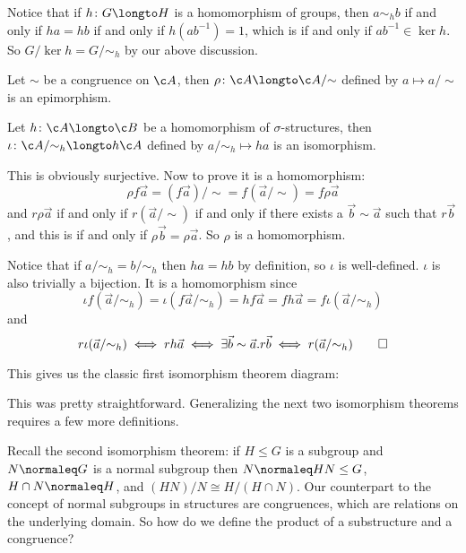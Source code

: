 Notice that if $h\colon G\longto H$ is a homomorphism of groups, then $a\sim_hb$ if and only if $ha=hb$ if and only if $h(ab^{-1})=1$, which is if and only if $ab^{-1}\in\ker h$.
So $G/\ker h=G/{\sim_h}$ by our above discussion.

\bthrm[title=The First Isomorphism Theorem]

    \benum
        \item Let $\sim$ be a congruence on $\c A$, then $\rho\colon\c A\longto\c A/{\sim}$ defined by $a\mapsto a/{\sim}$ is an epimorphism.
        \item Let $h\colon\c A\longto\c B$ be a homomorphism of $\sigma$-structures, then $\iota\colon\c A/{\sim_h}\longto h\c A$ defined by $a/{\sim_h}\mapsto ha$ is an isomorphism.
    \eenum

\ethrm

\Proof
\benum
    \item This is obviously surjective.
    Now to prove it is a homomorphism:
    $$ \rho f\vec a = (f\vec a)/{\sim} = f(\vec a/{\sim}) = f\rho\vec a $$
    and $r\rho\vec a$ if and only if $r(\vec a/{\sim})$ if and only if there exists a $\vec b\sim\vec a$ such that $r\vec b$, and this is if and only if $\rho\vec b=\rho\vec a$.
    So $\rho$ is a homomorphism.

    \item Notice that if $a/{\sim_h}=b/{\sim_h}$ then $ha=hb$ by definition, so $\iota$ is well-defined.
    $\iota$ is also trivially a bijection.
    It is a homomorphism since
    $$ \iota f(\vec a/{\sim_h}) = \iota(f\vec a/{\sim_h}) = hf\vec a = fh\vec a = f\iota(\vec a/{\sim_h}) $$
    and
    $$ r\iota(\vec a/{\sim_h}) \iff rh\vec a \iff \exists\vec b\sim\vec a.r\vec b \iff r(\vec a/{\sim_h}) \qed $$
\eenum

This gives us the classic first isomorphism theorem diagram:

\bigskip
\centerline{\def\diagcolbuf{1cm}\def\diagrowbuf{1cm}}

This was pretty straightforward.
Generalizing the next two isomorphism theorems requires a few more definitions.

\medskip
Recall the second isomorphism theorem: if $H\leq G$ is a subgroup and $N\normaleq G$ is a normal subgroup then $N\normaleq HN\leq G$, $H\cap N\normaleq H$, and $(HN)/N\cong H/(H\cap N)$.
Our counterpart to the concept of normal subgroups in structures are congruences, which are relations on the underlying domain.
So how do we define the product of a substructure and a congruence?

